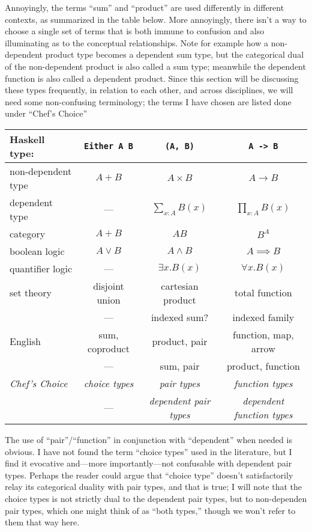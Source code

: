 \documentclass[11pt]{article} %
\theoremstyle{definition}
\theoremstyle{remark}
\begin{document}
Annoyingly, the terms ``sum'' and ``product'' are used differently in different contexts, as summarized in the table below.
More annoyingly, there isn't a way to choose a single set of terms that is both immune to confusion and also illuminating as to the conceptual relationships.
Note for example how a non-dependent product type becomes a dependent sum type, but the categorical dual of the non-dependent product is also called a sum type; meanwhile the dependent function is also called a dependent product.
Since this section will be discussing these types frequently, in relation to each other, and across disciplines, we will need some non-confusing terminology; the terms I have chosen are listed done under ``Chef's Choice''
\begin{center}
\begin{tabular}{lccc}
Haskell type: & \texttt{Either A B} & \texttt{(A, B)} & \texttt{A -> B} \\
\hline
non-dependent type  & $A + B$        & $A \times B$      & $A \to B$            \\
dependent type      & ---            & $\sum_{x:A}B(x)$  & $\prod_{x:A}B(x)$    \\
category            & $A+B$          & $AB$              & $B^A$                \\
boolean logic       & $A \lor B$     & $A \land B$       & $A \implies B$       \\
quantifier logic    & ---            & $\exists x.B(x)$  & $\forall x.B(x)$     \\
set theory          & disjoint union & cartesian product & total function       \\
                    & ---            & indexed sum?      & indexed family       \\
English             & sum, coproduct & product, pair     & function, map, arrow \\
                    & ---            & sum, pair         & product, function    \\
\emph{Chef's Choice} & \emph{choice types} & \emph{pair types} & \emph{function types} \\
                     & --- & \emph{dependent pair types} & \emph{dependent function types} \\
\end{tabular}
\end{center}
The use of ``pair''/``function'' in conjunction with ``dependent'' when needed is obvious.
I have not found the term ``choice types'' used in the literature, but I find it evocative and---more importantly---not confusable with dependent pair types.
Perhaps the reader could argue that ``choice type'' doesn't satisfactorily relay its categorical duality with pair types, and that is true; I will note that the choice types is not strictly dual to the dependent pair types, but to non-dependen pair types, which one might think of as ``both types,'' though we won't refer to them that way here.
\end{document}
